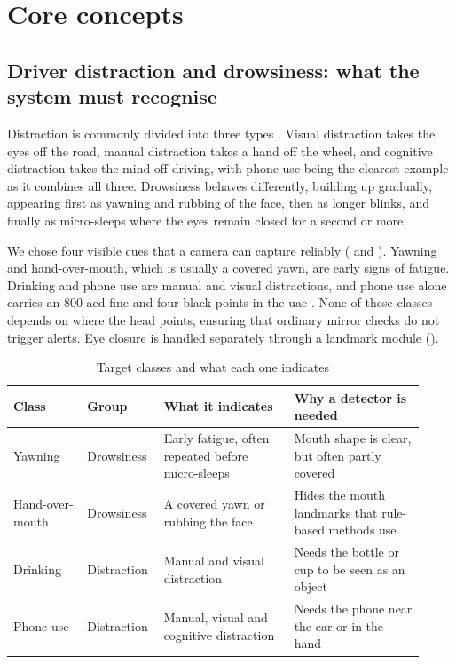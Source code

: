 
\section{Core concepts}
\subsection{Driver distraction and drowsiness: what the system must recognise}

Distraction is commonly divided into three types \cite{r72,r75}. Visual distraction takes the eyes off the road, manual distraction takes a hand off the wheel, and cognitive distraction takes the mind off driving, with phone use being the clearest example as it combines all three. Drowsiness behaves differently, building up gradually, appearing first as yawning and rubbing of the face, then as longer blinks, and finally as micro-sleeps where the eyes remain closed for a second or more.

We chose four visible cues that a camera can capture reliably ( and ). Yawning and hand-over-mouth, which is usually a covered yawn, are early signs of fatigue. Drinking and phone use are manual and visual distractions, and phone use alone carries an 800 \gls{aed} fine and four black points in the \gls{uae} \cite{r65}. None of these classes depends on where the head points, ensuring that ordinary mirror checks do not trigger alerts. Eye closure is handled separately through a landmark module ().

\begin{table}[htbp]
\centering
\caption{Target classes and what each one indicates}
\label{tab:ch3-classes}
\footnotesize
\setlength{\tabcolsep}{3pt}
\renewcommand{\arraystretch}{1.15}
\begin{tabular}{|p{0.17\linewidth}|p{0.15\linewidth}|p{0.30\linewidth}|p{0.30\linewidth}|}
\hline
\textbf{Class} & \textbf{Group} & \textbf{What it indicates} & \textbf{Why a detector is needed} \\
\hline
Yawning & Drowsiness & Early fatigue, often repeated before micro-sleeps & Mouth shape is clear, but often partly covered \\
\hline
Hand-over-mouth & Drowsiness & A covered yawn or rubbing the face & Hides the mouth landmarks that rule-based methods use \\
\hline
Drinking & Distraction & Manual and visual distraction & Needs the bottle or cup to be seen as an object \\
\hline
Phone use & Distraction & Manual, visual and cognitive distraction & Needs the phone near the ear or in the hand \\
\hline
\end{tabular}
\end{table}

